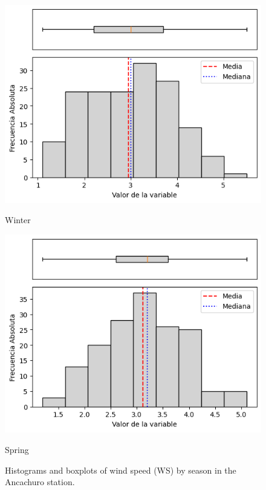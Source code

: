 \begin{figure}[H]
\begin{minipage}{0.30\textwidth}
  \includegraphics[width=\linewidth]{resultados/por_estacion_del_anio/boxplot_clases_por_estacion/Ancachuro/WS_HistBoxplot_Winter.png}
  \caption*{Winter}
\end{minipage}
\hfill
\begin{minipage}{0.30\textwidth}
  \includegraphics[width=\linewidth]{resultados/por_estacion_del_anio/boxplot_clases_por_estacion/Ancachuro/WS_HistBoxplot_Spring.png}
  \caption*{Spring}
\end{minipage}
\caption{Histograms and boxplots of wind speed (WS) by season in the Ancachuro station.}
\label{fig:ancachuro_ws_hist}
\end{figure}

